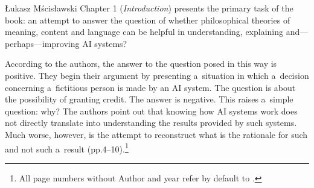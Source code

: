 \begin{newrevengenv}{Łukasz Mścisławski}
Chapter 1 (\textit{Introduction}) presents the primary task of the book: an attempt to answer the question of whether philosophical theories of meaning, content and language can be helpful in understanding, explaining and---perhaps---improving AI systems?

According to the authors, the answer to the question posed in this way is positive. They begin their argument by presenting a~situation in which a~decision concerning a~fictitious person is made by an AI system. The question is about the possibility of granting credit. The answer is negative. This raises a~simple question: why? The authors point out that knowing how AI systems work does not directly translate into understanding the results provided by such systems. Much worse, however, is the attempt to reconstruct what is the rationale for such and not such a~result (pp.4--10).\footnote{All page numbers without Author and year refer by default to
\parencite[][]{cappelen_making_2021}.%
}
\end{newrevengenv}
